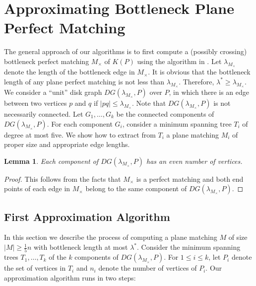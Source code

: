 \documentclass[11pt,a4paper]{article}
\newcommand{\MC}{M_\times}
\newcommand{\bt}{\lambda}
\newcommand{\btopt}{\lambda^*}
\newtheorem{lemma}{Lemma}
\begin{document}
\section{Approximating Bottleneck Plane Perfect Matching}
\label{bottleneck}


The general approach of our algorithms is to first compute a (possibly crossing) bottleneck perfect matching $\MC$ of $K(P)$ using the algorithm in \cite{Chang1992}. Let $\bt_{\MC}$ denote the length of the bottleneck edge in $\MC$. It is obvious that the bottleneck length of any plane perfect matching is not less than $\bt_{\MC}$. Therefore, $\btopt\ge\bt_{\MC}$. We consider a ``unit'' disk graph $DG(\bt_{\MC}, P)$ over $P$, in which there is an edge between two vertices $p$ and $q$ if $|pq|\le\bt_{\MC}$. Note that $DG(\bt_{\MC}, P)$ is not necessarily connected. Let $G_1,\dots,G_k$ be the connected components of $DG(\bt_{\MC}, P)$. For each component $G_i$, consider a minimum spanning tree $T_i$ of degree at most five. We show how to extract from $T_i$ a plane matching $M_i$ of proper size and appropriate edge lengths.

\begin{lemma}
 Each component of $DG(\bt_{\MC}, P)$ has an even number of vertices.
\end{lemma}
\begin{proof}
This follows from the facts that $\MC$ is a perfect matching and both end points of each edge in ${\MC}$ belong to the same component of $DG(\bt_{\MC}, P)$.
\end{proof}

\subsection{First Approximation Algorithm}
\label{bottleneck-five-over-two}
In this section we describe the process of computing a plane matching $M$ of size
$|M|\ge\frac{1}{5}n$ with bottleneck length at most $\btopt$. Consider the minimum spanning trees $T_1,\dots,T_k$ of the $k$ components of $DG(\bt_{\MC}, P)$. For $1\le i\le k$, let $P_i$ denote the set of vertices in $T_i$ and $n_i$ denote the number of vertices of $P_i$. Our approximation algorithm runs in two steps:
\end{document}
